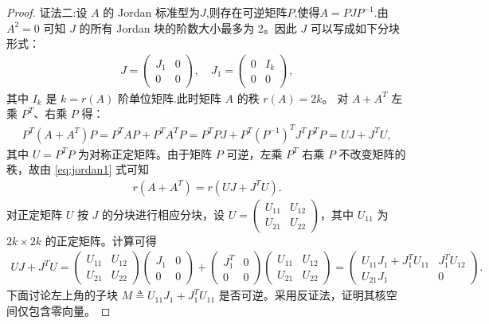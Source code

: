 \documentclass[../../main.tex]{subfiles}%
\begin{document}
\begin{proof}
{\color{blue}证法二:}设 \(A\) 的 Jordan 标准型为$J$,则存在可逆矩阵$P$,使得\(A=PJP^{-1}\).由 \(A^2=0\) 可知 \(J\) 的所有 Jordan 块的阶数大小最多为 2。因此 \(J\) 可以写成如下分块形式：
\begin{align*}
J = \begin{pmatrix} J_1 & 0 \\ 0 & 0 \end{pmatrix}, \quad J_1 = \begin{pmatrix} 0 & I_k \\ 0 & 0 \end{pmatrix},
\end{align*}
其中 \(I_k\) 是 \(k=r(A)\) 阶单位矩阵.此时矩阵 \(A\) 的秩 \(r(A)=2k\)。
对 \(A+A^T\) 左乘 \(P^T\)、右乘 \(P\) 得：
\begin{align}
P^T(A+A^T)P = P^TAP + P^TA^TP  = P^TPJ + P^T(P^{-1})^TJ^TP^TP 
= UJ + J^TU, \label{eq:jordan1}
\end{align}
其中 \(U = P^TP\) 为对称正定矩阵。由于矩阵 \(P\) 可逆，左乘 \(P^T\) 右乘 \(P\) 不改变矩阵的秩，故由 \eqref{eq:jordan1} 式可知
\begin{align}\label{eq::JifjisjiehwJIFWJI}
r(A+A^T) = r(UJ+J^TU).
\end{align}
对正定矩阵 \(U\) 按 \(J\) 的分块进行相应分块，设 \(U = \begin{pmatrix} U_{11} & U_{12} \\ U_{21} & U_{22} \end{pmatrix}\)，其中 \(U_{11}\) 为 \(2k \times 2k\) 的正定矩阵。计算可得
\begin{align*}
UJ + J^TU = \begin{pmatrix} U_{11} & U_{12} \\ U_{21} & U_{22} \end{pmatrix} \begin{pmatrix} J_1 & 0 \\ 0 & 0 \end{pmatrix} + \begin{pmatrix} J_1^T & 0 \\ 0 & 0 \end{pmatrix} \begin{pmatrix} U_{11} & U_{12} \\ U_{21} & U_{22} \end{pmatrix} = \begin{pmatrix} U_{11}J_1 + J_1^TU_{11} & J_1^TU_{12} \\ U_{21}J_1 & 0 \end{pmatrix}.
\end{align*}
下面讨论左上角的子块 \(M \triangleq U_{11}J_1 + J_1^TU_{11}\) 是否可逆。采用反证法，证明其核空间仅包含零向量。

\end{proof}
\end{document}
